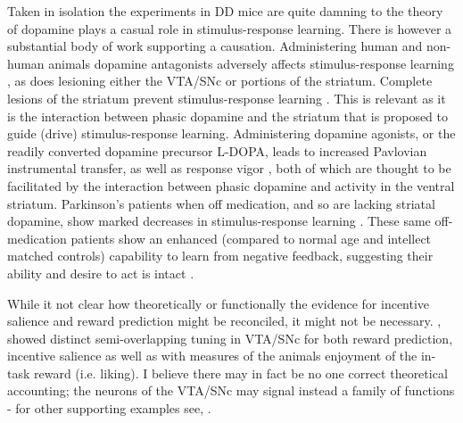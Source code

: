\documentclass[doc,12pt]{apa}        %
\begin{document}
Taken in isolation the experiments in DD mice are quite damning to the theory of dopamine plays a casual role in stimulus-response learning.  There is however a substantial body of work supporting a causation.  Administering human and non-human animals dopamine antagonists adversely affects stimulus-response learning \cite{Pizzagalli:2010p7205}, as does lesioning either the VTA/SNc or portions of the striatum.  Complete lesions of the striatum prevent stimulus-response learning \cite{Packard:2002p5074}.  This is relevant as it is the interaction between phasic dopamine and the striatum that is proposed to guide (drive) stimulus-response learning. Administering dopamine agonists, or the readily converted dopamine precursor L-DOPA, leads to increased Pavlovian instrumental transfer, as well as response vigor \cite{Winterbauer:2007p6352}, both of which are thought to be facilitated by the interaction between phasic dopamine and activity in the ventral striatum.  Parkinson's patients when off medication, and so are lacking striatal dopamine, show marked decreases in stimulus-response learning \cite{Pizzagalli:2010p7205}.  These same off-medication patients show an enhanced (compared to normal age and intellect matched controls) capability to learn from negative feedback, suggesting their ability and desire to act is intact \cite{Frank:2004p4709}.

While it not clear how theoretically or functionally the evidence for incentive salience and reward prediction might be reconciled, it might not be necessary.  , showed distinct semi-overlapping tuning in VTA/SNc for both reward prediction, incentive salience as well as with measures of the animals enjoyment of the in-task reward (i.e. liking).  I believe there may in fact be no one correct theoretical accounting; the neurons of the VTA/SNc may signal instead a family of functions - for other supporting examples see, .


\end{document}

